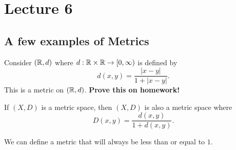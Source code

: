 \documentclass[a4paper]{report}
\begin{document}
\lhead{\rightmark}
\rhead{\thepage}

\section{Lecture 6}

\subsection{A few examples of Metrics}

\begin{eg}
    Consider \( (\mathbb{R}, d) \) where \( d: \mathbb{R} \times \mathbb{R} \to [0,\infty )  \) is defined by   
    \[  d(x,y) = \frac{ | x - y |  }{ 1 + | x - y |  }.  \]
    This is a metric on \( (\mathbb{R}, d) \). \textbf{Prove this on homework!}
\end{eg}

\begin{remark}
    If \( (X,D) \) is a metric space, then \( (X,D)  \) is also a metric space where
    \[  D(x,y) = \frac{ d(x,y) }{ 1 + d(x,y) }. \]
\end{remark}

We can define a metric that will always be less than or equal to \( 1 \).
\end{document}
